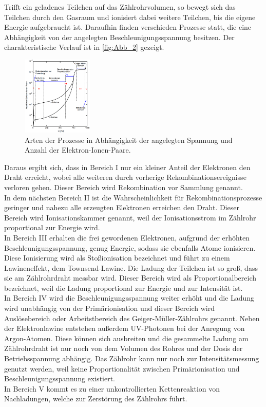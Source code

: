 Trifft ein geladenes Teilchen auf das Zählrohrvolumen, so bewegt sich das Teilchen 
durch den Gasraum und ionisiert dabei weitere Teilchen, bis die eigene Energie 
aufgebraucht ist. Daraufhin finden verschieden Prozesse statt, die eine Abhängigkeit
von der angelegten Beschleunigungsspannung besitzen. Der charakteristische Verlauf ist
in \autoref{fig:Abb_2} gezeigt.
\begin{figure}[H]
    \centering
    \includegraphics[width=0.3\textwidth]{Abbildungen/Abb_2.png}
    \caption{Arten der Prozesse in Abhängigkeit der angelegten Spannung und Anzahl der Elektron-Ionen-Paare.\cite{V703}}
    \label{fig:Abb_2}
\end{figure}
Daraus ergibt sich, dass in Bereich I nur ein kleiner Anteil der Elektronen den Draht erreicht,
wobei alle weiteren durch vorherige Rekombinationsereignisse verloren gehen. Dieser Bereich wird
Rekombination vor Sammlung genannt. \\
In dem nächsten Bereich II ist die Wahrscheinlichkeit für Rekombinationsprozesse geringer und 
nahezu alle erzeugten Elektronen erreichen den Draht. Dieser Bereich wird Ionisationskammer
genannt, weil der Ionisationsstrom im Zählrohr proportional zur Energie wird.\\
In Bereich III erhalten die frei gewordenen Elektronen, aufgrund der erhöhten Beschleunigungsspannung,
genug Energie, sodass sie ebenfalls Atome ionisieren. Diese Ionisierung wird als Stoßionisation
bezeichnet und führt zu einem Lawineneffekt, dem Townsend-Lawine.
Die Ladung der Teilchen ist so groß, dass sie am Zählrohrdraht messbar wird.
Dieser Bereich wird als Proportionalbereich bezeichnet, weil die Ladung proportional zur Energie 
und zur Intensität ist.\\
In Bereich IV wird die Beschleunigungsspannung weiter erhöht und die Ladung wird unabhängig von der
Primärionisation und dieser Bereich wird Auslösebereich oder Arbeitstbereich des Geiger-Müller-Zählrohrs
genannt.
Neben der Elektronlawine entstehen außerdem UV-Photonen bei der Anregung von Argon-Atomen.
Diese können sich ausbreiten und die gesammelte Ladung am Zählrohrdraht ist nur noch von dem Volumen
des Rohres und der Dosis der Betriebsspannung abhängig. 
Das Zählrohr kann nur noch zur Intensitätsmessung genutzt werden, weil keine Proportionalität zwischen 
Primärionisation und Beschleunigungsspannung existiert.\\
In Bereich V kommt es zu einer unkontrollierten Kettenreaktion von Nachladungen, welche zur Zerstörung des
Zählrohrs führt.

